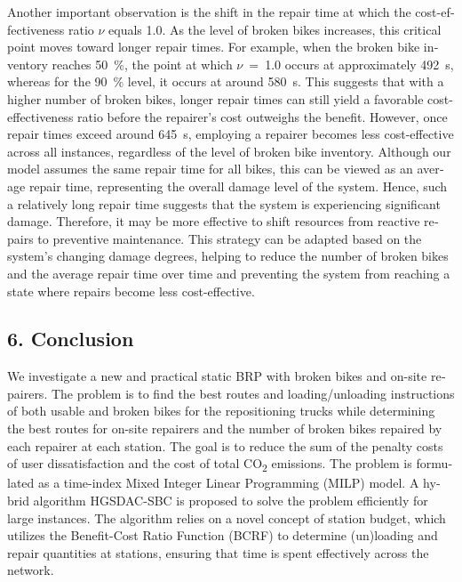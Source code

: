 \documentclass[
  english,
]{article}
\begin{document}
\begin{otherlanguage}{english}
\protect{}\label{p0685}
Another important observation is the shift in the repair time at which the cost-effectiveness ratio
\(\nu\) equals 1.0. As the level of broken bikes increases, this critical point moves toward longer
repair times. For example, when the broken bike inventory reaches 50~\%, the point at which
\(\nu\)~=~1.0 occurs at approximately 492~s, whereas for the 90~\% level, it occurs at around 580~s.
This suggests that with a higher number of broken bikes, longer repair times can still yield a
favorable cost-effectiveness ratio before the repairer's cost outweighs the benefit. However, once
repair times exceed around 645~s, employing a repairer becomes less cost-effective across all
instances, regardless of the level of broken bike inventory. Although our model assumes the same
repair time for all bikes, this can be viewed as an average repair time, representing the overall
damage level of the system. Hence, such a relatively long repair time suggests that the system is
experiencing significant damage. Therefore, it may be more effective to shift resources from
reactive repairs to preventive maintenance. This strategy can be adapted based on the system's
changing damage degrees, helping to reduce the number of broken bikes and the average repair time
over time and preventing the system from reaching a state where repairs become less cost-effective.

\protect{}\label{s0130}
\subsection{6. Conclusion}\label{st150}

\protect{}\label{p0690}
We investigate a new and practical static BRP with broken bikes and on-site repairers. The problem
is to find the best routes and loading/unloading instructions of both usable and broken bikes for
the repositioning trucks while determining the best routes for on-site repairers and the number of
broken bikes repaired by each repairer at each station. The goal is to reduce the sum of the penalty
costs of user dissatisfaction and the cost of total CO\textsubscript{2} emissions. The problem is
formulated as a time-index Mixed Integer Linear Programming (MILP) model. A hybrid algorithm
HGSDAC-SBC is proposed to solve the problem efficiently for large instances. The algorithm relies on
a novel concept of station budget, which utilizes the Benefit-Cost Ratio Function (BCRF) to
determine (un)loading and repair quantities at stations, ensuring that time is spent effectively
across the network.


\end{otherlanguage}
\end{document}
